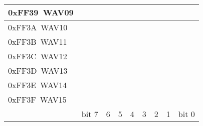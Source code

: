 \begin{landscape}
\begin{table}
\begin{center}
\begin{tabularx}{\linewidth}{|l|C|C|C|C|C|C|C|C|}
      0xFF39~WAV09 & & & & & & & & \\
      \hline
      0xFF3A~WAV10 & & & & & & & & \\
      \hline
      0xFF3B~WAV11 & & & & & & & & \\
      \hline
      0xFF3C~WAV12 & & & & & & & & \\
      \hline
      0xFF3D~WAV13 & & & & & & & & \\
      \hline
      0xFF3E~WAV14 & & & & & & & & \\
      \hline
      0xFF3F~WAV15 & & & & & & & & \\
      \hline
      & bit 7 & 6 & 5 & 4 & 3 & 2 & 1 & bit 0 \\
      \hline
    \end{tabularx}
  \end{center}
\end{table}


\end{landscape}
